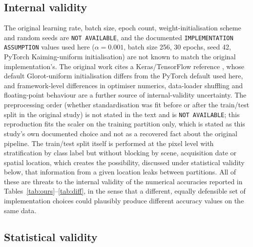 \documentclass[10pt,twocolumn,a4paper]{article}
\newcommand{\evc}[1]{{\footnotesize\texttt{#1}}}
\begin{document}
\subsection{Internal validity}
\label{sec:threats-internal}

The original learning rate, batch size, epoch count, weight-initialisation scheme and random seeds
are \evc{NOT AVAILABLE}, and the documented \evc{IMPLEMENTATION ASSUMPTION} values used here
($\alpha=0.001$, batch size 256, 30 epochs, seed 42, PyTorch Kaiming-uniform initialisation) are not
known to match the original implementation's. The original work cites a Keras/TensorFlow reference
\citep{chollet2021}, whose default Glorot-uniform initialisation differs from the PyTorch default
used here, and framework-level differences in optimiser numerics, data-loader shuffling and
floating-point behaviour are a further source of internal-validity uncertainty. The preprocessing
order (whether standardisation was fit before or after the train/test split in the original study)
is not stated in the text and is \evc{NOT AVAILABLE}; this reproduction fits the scaler on the
training partition only, which is stated as this study's own documented choice and not as a
recovered fact about the original pipeline. The train/test split itself is performed at the pixel
level with stratification by class label but without blocking by scene, acquisition date or spatial
location, which creates the possibility, discussed under statistical validity below, that
information from a given location leaks between partitions. All of these are threats to the
internal validity of the numerical accuracies reported in Tables~\ref{tab:ours}--\ref{tab:diff}, in
the sense that a different, equally defensible set of implementation choices could plausibly
produce different accuracy values on the same data.

\subsection{Statistical validity}
\label{sec:threats-statistical}
\end{document}
